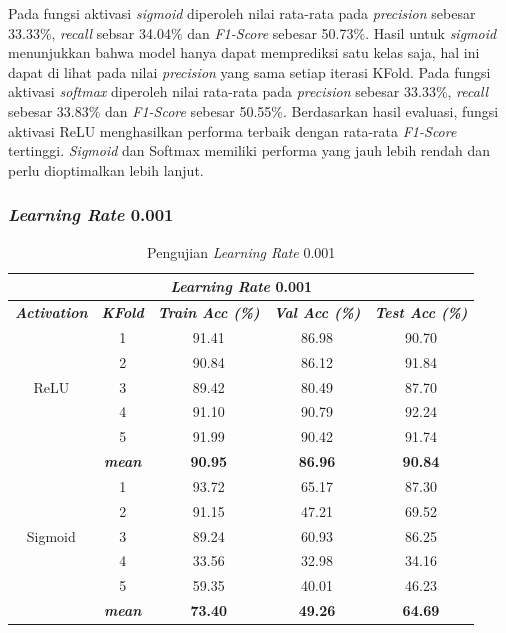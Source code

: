 \begin{table}[H]
     Pada fungsi aktivasi \textit{sigmoid} diperoleh nilai rata-rata pada \textit{precision} sebesar 33.33\%, \textit{recall} sebsar 34.04\% dan\textit{ F1-Score} sebesar 50.73\%. Hasil untuk \textit{sigmoid} menunjukkan bahwa model hanya dapat memprediksi satu kelas saja, hal ini dapat di lihat pada nilai \textit{precision} yang sama setiap iterasi KFold. Pada fungsi aktivasi \textit{softmax} diperoleh nilai rata-rata pada \textit{precision} sebesar 33.33\%, \textit{recall} sebesar 33.83\% dan \textit{F1-Score} sebesar 50.55\%.
     Berdasarkan hasil evaluasi, fungsi aktivasi ReLU menghasilkan performa terbaik dengan rata-rata \textit{F1-Score} tertinggi. \textit{Sigmoid} dan Softmax memiliki performa yang jauh lebih rendah dan perlu dioptimalkan lebih lanjut.


 

    \subsubsection{\textit{Learning Rate} 0.001}
    
    \begin{table}[H]
        \centering
        \caption{Pengujian \textit{Learning Rate} 0.001 }
        \begin{tabular}{ccccc}
            \toprule
            \multicolumn{5}{c}{\textit{Learning Rate} 0.001} \\ \hline
            
            \textbf{\textit{Activation}} & \multicolumn{1}{c}{\textbf{\textit{KFold}}} & \textbf{\textit{Train Acc (\%)} } & \textbf{\textit{Val Acc (\%)}} & \textbf{\textit{Test Acc (\%)}}  \\
    
            \midrule
            \multirow{5}{*}{ReLU} 
            & 1 & 91.41 & 86.98 & 90.70  \\
            & 2 & 90.84 & 86.12 & 91.84 \\
            & 3 & 89.42 & 80.49 & 87.70 \\
            & 4 & 91.10 & 90.79 & 92.24 \\
            & 5 & 91.99 & 90.42 & 91.74  \\
            & \textit{\textbf{mean}}& \textbf{90.95} & \textbf{86.96} &\textbf{ 90.84} \\ \hline
    
            \multirow{5}{*}{Sigmoid}
            & 1 &  93.72 & 65.17 & 87.30  \\
            & 2 &  91.15 & 47.21 & 69.52 \\
            & 3 &  89.24 & 60.93 & 86.25 \\
            & 4 &  33.56 & 32.98 & 34.16 \\
            & 5 &  59.35 & 40.01 & 46.23 \\
            & \textit{\textbf{mean}}& \textbf{73.40} & \textbf{49.26} &\textbf{64.69} \\ 
                        \hline
    

\end{tabular}
\end{table}
\end{table}
